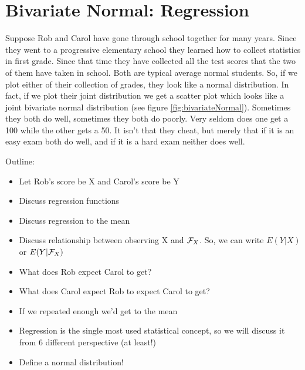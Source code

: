 \documentclass[14pt]{extarticle}
\newcommand{\notes}{}
\begin{document}
    \section{Bivariate Normal: Regression}

Suppose Rob and Carol have gone through school together for many
years.  Since they went to a progressive elementary school they
learned how to collect statistics in first grade.  Since that time
they have collected all the test scores that the two of them have
taken in school.  Both are typical average normal students.  So, if we
plot either of their collection of grades, they look like a normal
distribution.  In fact, if we plot their joint distribution we get a
scatter plot which looks like a joint bivariate normal distribution
(see figure \ref{fig:bivariateNormal}).  Sometimes they both do well,
sometimes they both do poorly.  Very seldom does one get a 100 while
the other gets a 50.  It isn't that they cheat, but merely that if it
is an easy exam both do well, and if it is a hard exam neither does
well.

\begin{figure*}[htp]
\end{figure*}

{\notes Outline:
\begin{itemize}
\item Let Rob's score be X and Carol's score be Y
\item Discuss regression functions
\item Discuss regression to the mean
\item Discuss relationship between observing X and ${\cal F}_X$.  So,
we can write $E(Y|X)$ or $E(Y|{\cal F}_X)$
\item What does Rob expect Carol to get?
\item What does Carol expect Rob to expect Carol to get?
\item If we repeated enough we'd get to the mean
\item Regression is the single most used statistical concept, so we will
discuss it from 6 different perspective (at least!) 
\item Define a \label{def:normal} normal distribution! 
\end{itemize}
}
\end{document}
